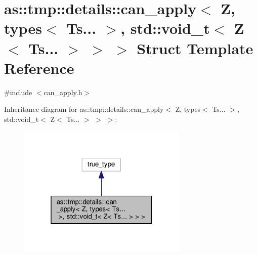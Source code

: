 \hypertarget{structas_1_1tmp_1_1details_1_1can__apply_3_01Z_00_01types_3_01Ts_8_8_8_01_4_00_01std_1_1void__t_d0380c4f39b26cf3dcf2ed45500ba357}{}\section{as\+:\+:tmp\+:\+:details\+:\+:can\+\_\+apply$<$ Z, types$<$ Ts... $>$, std\+:\+:void\+\_\+t$<$ Z$<$ Ts... $>$ $>$ $>$ Struct Template Reference}
\label{structas_1_1tmp_1_1details_1_1can__apply_3_01Z_00_01types_3_01Ts_8_8_8_01_4_00_01std_1_1void__t_d0380c4f39b26cf3dcf2ed45500ba357}


{\ttfamily \#include $<$can\+\_\+apply.\+h$>$}



Inheritance diagram for as\+:\+:tmp\+:\+:details\+:\+:can\+\_\+apply$<$ Z, types$<$ Ts... $>$, std\+:\+:void\+\_\+t$<$ Z$<$ Ts... $>$ $>$ $>$\+:
\nopagebreak
\begin{figure}[H]
\begin{center}
\leavevmode
\includegraphics[width=229pt]{structas_1_1tmp_1_1details_1_1can__apply_3_01Z_00_01types_3_01Ts_8_8_8_01_4_00_01std_1_1void__t_299e711cbe14dcd24ae19586cb63c206}
\end{center}
\end{figure}


